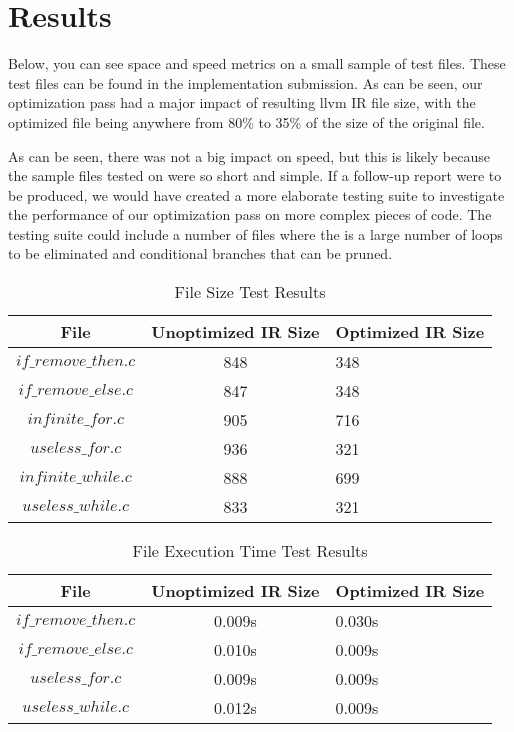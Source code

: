\documentclass[sigconf]{acmart}
\begin{document}
\section{Results}
Below, you can see space and speed metrics on a small sample of test files. These test files can 
be found in the implementation submission.
As can be seen, our optimization pass had a major impact of resulting llvm IR file size, with the 
optimized file being anywhere from 80\% to 35\% of the size of the original file. 

As can be seen, there was not a big impact on speed, but this is likely because the sample files tested on were so 
short and simple. If a follow-up report were to be produced, we would have created a more 
elaborate testing suite to investigate the performance of our optimization pass on more complex 
pieces of code. The testing suite could include a number of files where the is a large number of loops to be 
eliminated and conditional branches that can be pruned.



\begin{table*}
  \caption{File Size Test Results}
  \begin{tabular}{ccl}
    \toprule
    File & Unoptimized IR Size & Optimized IR Size \\
    \midrule
    \texttt{$if\_remove\_then.c$}& 848& 348 \\
    \texttt{$if\_remove\_else.c$}&  847& 348\\
    \texttt{$infinite\_for.c$}& 905& 716 \\
    \texttt{$useless\_for.c$}& 936& 321  \\
    \texttt{$infinite\_while.c$}& 888 & 699 \\
    \texttt{$useless\_while.c$}& 833 & 321  \\
    \bottomrule
  \end{tabular}
\end{table*}

\begin{table*}
  \caption{File Execution Time Test Results}
  \label{tab:commands}
  \begin{tabular}{ccl}
    \toprule
    File & Unoptimized IR Size & Optimized IR Size \\
    \midrule
    \texttt{$if\_remove\_then.c$}& 0.009s & 0.030s \\
    \texttt{$if\_remove\_else.c$}&  0.010s & 0.009s \\
    \texttt{$useless\_for.c$}& 0.009s & 0.009s  \\
    \texttt{$useless\_while.c$}& 0.012s &  0.009s \\
    \bottomrule
  \end{tabular}
\end{table*}
\end{document}
